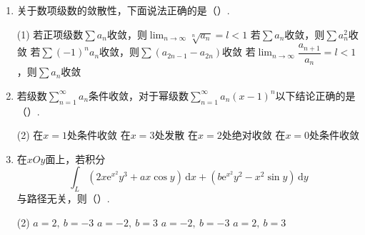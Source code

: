 \documentclass[../main.tex]{subfiles}
\begin{document}
\begin{enumerate}
    \item 关于数项级数的敛散性，下面说法正确的是（\qquad）.

          \begin{tasks}[label=\textbf{\Alph*.}, label-width=1.5em, column-sep=1em](1)
              \task 若正项级数$\displaystyle\sum a_n$收敛，则$\displaystyle\lim_{n\to\infty}\sqrt[n]{a_n}=l<1$
              \task 若$\displaystyle\sum a_n$收敛，则$\displaystyle\sum a_n^2$收敛
              \task 若$\displaystyle\sum (-1)^n a_n$收敛，则$\displaystyle\sum(a_{2n-1}-a_{2n})$收敛
              \task 若$\displaystyle\lim_{n\to\infty}\dfrac{a_{n+1}}{a_n}=l<1$，则$\displaystyle\sum a_n$收敛
          \end{tasks}

    \item 若级数$\displaystyle\sum_{n=1}^{\infty}a_n$条件收敛，对于幂级数$\displaystyle\sum_{n=1}^{\infty}a_n(x-1)^n$以下结论正确的是（\qquad）.

          \begin{tasks}[label=\textbf{\Alph*.}, label-width=1.5em, column-sep=1em](2)
              \task 在$x=1$处条件收敛
              \task 在$x=3$处发散
              \task 在$x=2$处绝对收敛
              \task 在$x=0$处条件收敛
          \end{tasks}

    \item 在$xOy$面上，若积分
          \[
              \int_L(2x\mathrm{e}^{x^2}y^3+ax\cos y)\,\mathrm{d}x+(b\mathrm{e}^{x^2}y^2-x^2\sin y)\,\mathrm{d}y
          \]
          与路径无关，则（\qquad）.

          \begin{tasks}[label=\textbf{\Alph*.}, label-width=1.5em, column-sep=1em](2)
              \task $a=2,\ b=-3$
              \task $a=-2,\ b=3$
              \task $a=-2,\ b=-3$
              \task $a=2,\ b=3$
          \end{tasks}
\end{enumerate}
\end{document}
